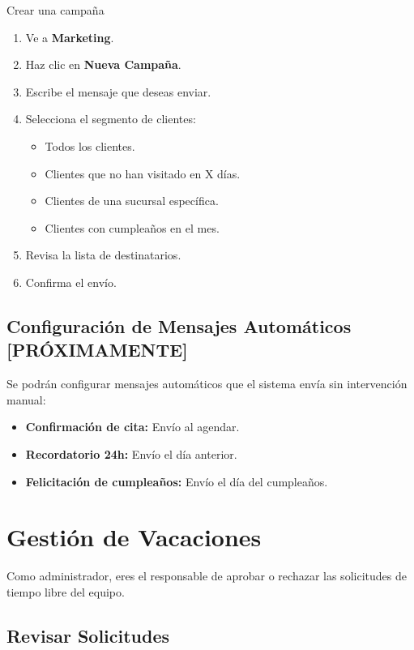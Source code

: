 \documentclass[12pt,a4paper]{article}
\begin{document}
\begin{pasobox}{Crear una campaña}
\begin{enumerate}[leftmargin=*]
  \item Ve a \textbf{Marketing}.
  \item Haz clic en \textbf{Nueva Campaña}.
  \item Escribe el mensaje que deseas enviar.
  \item Selecciona el segmento de clientes:
    \begin{itemize}
      \item Todos los clientes.
      \item Clientes que no han visitado en X días.
      \item Clientes de una sucursal específica.
      \item Clientes con cumpleaños en el mes.
    \end{itemize}
  \item Revisa la lista de destinatarios.
  \item Confirma el envío.
\end{enumerate}
\end{pasobox}

\subsection{Configuración de Mensajes Automáticos [PRÓXIMAMENTE]}

Se podrán configurar mensajes automáticos que el sistema envía sin intervención manual:
\begin{itemize}[leftmargin=*]
  \item \textbf{Confirmación de cita:} Envío al agendar.
  \item \textbf{Recordatorio 24h:} Envío el día anterior.
  \item \textbf{Felicitación de cumpleaños:} Envío el día del cumpleaños.
\end{itemize}

\newpage
\section{Gestión de Vacaciones}

Como administrador, eres el responsable de aprobar o rechazar las solicitudes de tiempo libre del equipo.

\subsection{Revisar Solicitudes}
\end{document}
